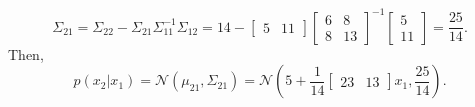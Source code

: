 \documentclass[12pt,letterpaper,fleqn]{hmcpset}
\begin{document}
\begin{solution}
\begin{enumerate}[(a)]
$$\Sigma_{21} = \Sigma_{22} - \Sigma_{21}\Sigma_{11}^{-1}\Sigma_{12} = 14 - \begin{bmatrix} 5 & 11 \end{bmatrix} \begin{bmatrix} 6 & 8 \\ 8 & 13 \end{bmatrix}^{-1} \begin{bmatrix} 5 \\ 11 \end{bmatrix} = \frac{25}{14}.$$
Then, $$p(x_2|x_1) = \mathcal{N} (\mu_{21}, \Sigma_{21})=\mathcal{N}\left(5 + \frac{1}{14} \begin{bmatrix} 23 & 13 \end{bmatrix} x_1, \frac{25}{14}\right).
$$

\end{enumerate}
\end{solution}
\newpage
\end{document}

